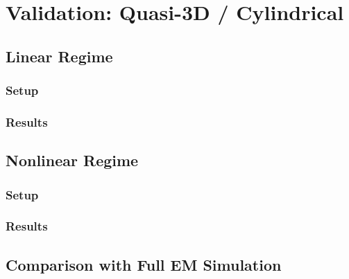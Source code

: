 \newpage
\section{Validation: Quasi-3D / Cylindrical}

\subsection{Linear Regime}
    \subsubsection{Setup}
    \subsubsection{Results}
\subsection{Nonlinear Regime}
    \subsubsection{Setup}
    \subsubsection{Results}
\subsection{Comparison with Full EM Simulation}
